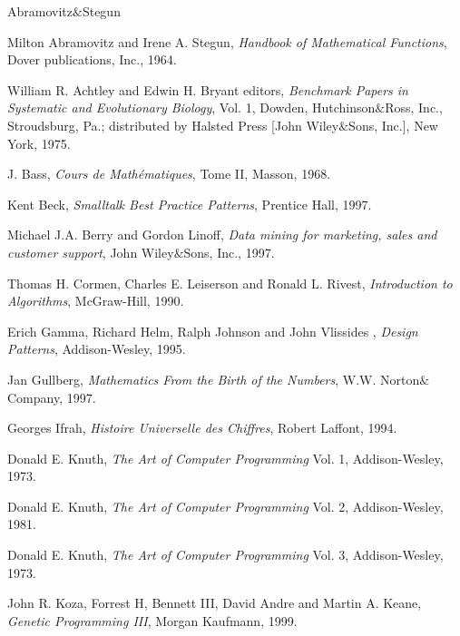\begin{thebibliography}{Abramovitz\thinspace$\&$\thinspace Stegun}

Milton Abramovitz and Irene A. Stegun, {\em Handbook of Mathematical Functions}, Dover publications, Inc., 1964.

William R. Achtley and Edwin H. Bryant editors,
{\em Benchmark Papers in Systematic and Evolutionary Biology},
Vol. 1, Dowden, Hutchinson\thinspace$\&$\thinspace Ross, Inc.,
Stroudsburg, Pa.; distributed by Halsted Press [John
Wiley\thinspace$\&$\thinspace Sons, Inc.], New York, 1975.

J. Bass, {\em Cours de Mathématiques}, Tome II, Masson, 1968.

Kent Beck, {\em Smalltalk Best Practice Patterns}, Prentice
Hall, 1997.

Michael J.A. Berry and Gordon Linoff, {\em Data mining for
marketing, sales and customer support}, John
Wiley\thinspace$\&$\thinspace Sons, Inc., 1997.

Thomas H. Cormen, Charles E. Leiserson and Ronald L. Rivest, {\em
Introduction to Algorithms}, McGraw-Hill, 1990.

Erich Gamma, Richard Helm, Ralph Johnson and John Vlissides , {\em
Design Patterns}, Addison-Wesley, 1995.

 Jan Gullberg, {\em Mathematics From the Birth of the Numbers},
W.W. Norton\thinspace$\&$\thinspace Company, 1997.

Georges Ifrah, {\em Histoire Universelle des Chiffres},
Robert Laffont, 1994.

Donald E. Knuth, {\em The Art of
Computer Programming} Vol. 1, Addison-Wesley, 1973.

Donald E. Knuth, {\em The Art of Computer Programming} Vol. 2,
Addison-Wesley, 1981.

Donald E. Knuth, {\em The Art of
Computer Programming} Vol. 3, Addison-Wesley, 1973.

John R. Koza, Forrest H, Bennett III, David Andre and Martin A. Keane,
{\em Genetic Programming III}, Morgan Kaufmann, 1999.


\end{thebibliography}

